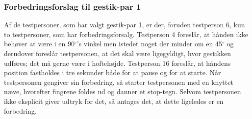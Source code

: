 \subsubsection{Forbedringsforslag til gestik-par 1}
\label{TestresultaterValgAfGestikkerForbedringGP1}
%
Af de testpersoner, som har valgt gestik-par 1, er der, foruden testperson 6, kun to testpersoner, som har forbedringsforsalg. Testperson 4 foreslår, at hånden ikke behøver at være i en 90$^{\circ}$'s vinkel men istedet noget der minder om en 45$^{\circ}$ og derudover foreslår testpersonen, at det skal være ligegyldigt, hvor gestikken udføres; det må gerne være i hoftehøjde. Testperson 16 foreslår, at håndens position fastholdes i tre sekunder både for at pause og for at starte. Når testpersonen gengiver sin forbedring, så starter testpersonen med en knyttet næve, hvorefter fingrene foldes ud og danner et stop-tegn. Selvom testpersonen ikke eksplicit giver udtryk for det, så antages det, at dette ligeledes er en forbedring.
%
